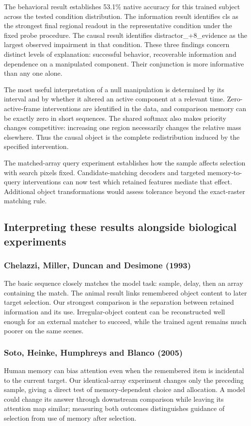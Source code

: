 \documentclass[11pt]{article}
\begin{document}
The behavioral result establishes 53.1\% native accuracy for this trained subject across the tested condition distribution. The information result identifies cls as the strongest final regional readout in the representative condition under the fixed probe procedure. The causal result identifies distractor\_\allowbreak{}+8\_\allowbreak{}evidence as the largest observed impairment in that condition. These three findings concern distinct levels of explanation: successful behavior, recoverable information and dependence on a manipulated component. Their conjunction is more informative than any one alone.

The most useful interpretation of a null manipulation is determined by its interval and by whether it altered an active component at a relevant time. Zero-active-frame interventions are identified in the data, and comparison memory can be exactly zero in short sequences. The shared softmax also makes priority changes competitive: increasing one region necessarily changes the relative mass elsewhere. Thus the causal object is the complete redistribution induced by the specified intervention.

The matched-array query experiment establishes how the sample affects selection with search pixels fixed. Candidate-matching decoders and targeted memory-to-query interventions can now test which retained features mediate that effect. Additional object transformations would assess tolerance beyond the exact-raster matching rule.

\subsection{Interpreting these results alongside biological experiments}
\subsubsection{Chelazzi, Miller, Duncan and Desimone (1993)}
The basic sequence closely matches the model task: sample, delay, then an array containing the match. The animal result links remembered object content to later target selection. Our strongest comparison is the separation between retained information and its use. Irregular-object content can be reconstructed well enough for an external matcher to succeed, while the trained agent remains much poorer on the same scenes. \cite{bio_chelazzi}

\subsubsection{Soto, Heinke, Humphreys and Blanco (2005)}
Human memory can bias attention even when the remembered item is incidental to the current target. Our identical-array experiment changes only the preceding sample, giving a direct test of memory-dependent choice and allocation. A model could change its answer through downstream comparison while leaving its attention map similar; measuring both outcomes distinguishes guidance of selection from use of memory after selection. \cite{bio_soto}
\end{document}
